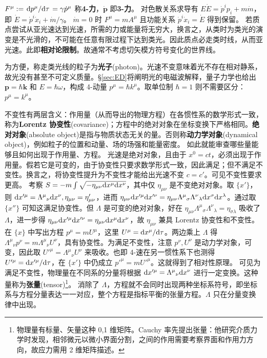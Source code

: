 $F^\mu:=\dv*{p^\mu}{\tau}=\gamma \dot p^\mu$ 称\textbf{4-力}，$\dot{\bm p}$ 即\textbf{3-力}。
对色散关系求导有 $E\dot E=\dot p^i p_i+m\dot m$，即 $\dot E=\dot p^i\dot x_i+\dot m/\gamma$。
$\dot m=0$ 时 $F^\mu=m A^\mu$ 且功能关系 $\dot p^i \dot{x}_i=\dot{E}$ 得到保留。
若质点尝试从亚光速达到光速，所需的力或能量将无穷大，换言之，从类时为类光的演变是不光滑的，不可能在任意有限过程下达到类光。因此质点必走类时线，从而亚光速。此即\textbf{相对论限制}。故通常不考虑切矢模方符号变化的世界线。

为方便，称走类光线的粒子为\textbf{光子}(photon)。光速不变意味着光不存在相对静系，故光没有甚至不可定义质量。\S\ref{sec:ED}将阐明光的电磁波解释，量子力学也给出 $\bm p = \hbar\bm k$ 和 $E=\hbar\omega$，构成 4-动量 $p^\mu=\hbar k^\mu$。取单位制 $\hbar=1$ 则不需要区分：$p^\mu=k^\mu$。

不变性有两层含义：作用量（从而导出的物理方程）在各惯性系的数学形式一致，称为\textbf{Lorentz 协变性}(covariance)；方程中的绝对对象在坐标变换下严格相同。\textbf{绝对对象}(absolute object)是指与物质状态无关的量。否则称\textbf{动力学对象}(dynamical object)，例如粒子的位置和动量、场的场强和能量密度。
如此就能审查哪些量能够且如何出现于作用量、方程。
光速是绝对对象，且由于 $x^0=ct$，必须出现于作用量。假若它是可变的，由于协变性只要求数学形式一致，因此满足；但不满足不变性。换言之，将协变性提升为不变性才能给出光速不变 $c=c'$。可见不变性要求更高。
考察 $S=-m\int\sqrt{-\eta_{\mu\nu}\dd x^\mu \dd x^\nu}$，其中仅 $\eta_{\mu\nu}$ 是不变绝对对象。取 $\{x'\}$，则 $\dd x'^\mu=\Lambda^\mu{}_\nu \dd x^\nu, \eta_{\mu\nu}=\eta_{\mu\nu}'$，进而 $\eta_{\mu\nu}\dd x'^\mu \dd x'^\nu=\eta_{\mu\nu}\Lambda^{\mu}{}_{\sigma}{\Lambda^{\nu}}_{\lambda}\dd x^\sigma \dd x^\lambda$。通过取 $\{x''\}$ 可知这满足协变性。但 $\Lambda$ 是可变的绝对对象，好在 $\eta_{\mu\nu}\Lambda^{\mu}{}_{\sigma}{\Lambda^{\nu}}_{\lambda}={\eta}_{\sigma\lambda}$ 吸收了 $\Lambda$，进一步得 $\eta_{\mu\nu}\dd x'^\mu \dd x'^\nu=\eta_{\mu\nu}\dd x^\mu \dd x^\nu$，故 $\eta_{\mu\nu}$ 兼具 Lorentz 协变性和不变性。
在 $\{x\}$ 中写出方程 $p^\mu=m U^\mu$，这里 $U^\mu=\dd x^\mu/\dd\tau$。两边乘上 $\Lambda$ 得 $\Lambda^\mu{}_\nu p^\nu = m \Lambda^\mu{}_\nu U^\nu$，具有协变性。为满足不变性，注意 $p^\nu,U^\nu$ 是动力学对象，可变，因此取 $U'^\mu=\Lambda^\mu{}_\nu U^\nu$ 来吸收。也即 4-速在另一惯性系下也测得 $U'^\mu=\dd x'^\mu/\dd\tau$，在 $\{x'\}$ 中仍成立 $p'^\mu=m U'^\mu$。这就得到了相对性原理。
可见为满足不变性，物理量在不同系的分量将根据 $\dd x'^\mu=\Lambda^\mu{}_\nu \dd x^\nu$ 进行一定变换。这种量称为\textbf{张量}(tensor)\footnote{物理量有标量、矢量这种 0,1 维矩阵。Cauchy 率先提出张量：他研究介质力学时发现，相邻微元以微小界面分割，之间的作用需要考察界面和作用力方向，故应力需用 2 维矩阵描述。}。
消除了 $\Lambda$，方程就不会同时出现两种坐标系符号，即坐标系与方程分量表达一一对应，整个方程是指标平衡的张量方程。$\Lambda$ 只在分量变换律中出现。

